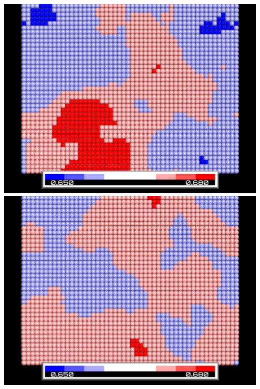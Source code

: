 \begin{center}
\includegraphics[scale=0.01]{Plots/glomepro/snap_MEM-DPPG_1_do.png}
\includegraphics[scale=0.01]{Plots/glomepro/snap_MEM-DPPG_1_up.png}
\end{center} 

%  
